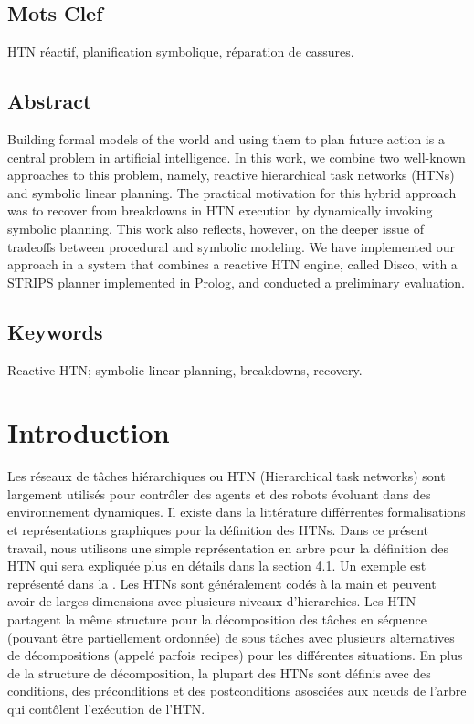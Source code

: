 \documentclass[a4paper,twoside,french]{article}
\begin{document}
				\subsection*{Mots Clef}
				HTN réactif, planification symbolique, réparation de cassures.
				
				\subsection*{Abstract}
				Building formal models of the world and using them to plan future
				action is a central problem in artificial intelligence.  In this
				work, we combine two well-known approaches to this problem, namely,
				reactive hierarchical task networks (HTNs) and symbolic linear
				planning.  The practical motivation for this hybrid approach was to
				recover from breakdowns in HTN execution by dynamically invoking
				symbolic planning.  This work also reflects, however, on the deeper
				issue of tradeoffs between procedural and symbolic modeling.  We
				have implemented our approach in a system that combines a reactive
				HTN engine, called Disco, with a STRIPS planner implemented in
				Prolog, and conducted a preliminary evaluation.
				\subsection*{Keywords}
				Reactive HTN; symbolic linear planning, breakdowns, recovery.
				
				
				\section{Introduction}
				Les r\'eseaux de t\^aches hi\'erarchiques ou HTN \cite{erol1994htn} (Hierarchical task networks) sont largement utilis\'es pour contr\^oler des agents et des robots \'evoluant dans des environnement dynamiques. Il existe dans la litt\'erature diff\'errentes formalisations et  repr\'esentations graphiques pour la d\'efinition des HTNs. Dans ce pr\'esent travail, nous utilisons une simple repr\'esentation en arbre pour la  d\'efinition des HTN qui sera expliqu\'ee plus en d\'etails dans la section 4.1. Un exemple est repr\'esent\'e dans la .
				Les HTNs sont g\'en\'eralement cod\'es \`a la main et peuvent avoir de larges dimensions avec plusieurs niveaux d'hierarchies.  Les HTN partagent la m\^eme structure pour la d\'ecomposition des t\^aches en s\'equence (pouvant \^etre partiellement ordonn\'ee) de sous t\^aches avec plusieurs alternatives de d\'ecompositions (appel\'e parfois recipes) pour les diff\'erentes situations. En plus de la structure de d\'ecomposition, la plupart des HTNs sont d\'efinis avec des conditions, des pr\'econditions et des postconditions asosci\'ees aux n\oe uds de l'arbre qui  cont\^olent l'ex\'ecution de l'HTN.
								
\end{document}
